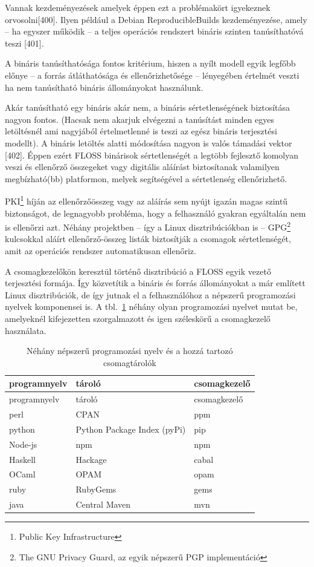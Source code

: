 \documentclass[12pt,magyar,a4paper,oneside]{scrreprt}
\begin{document}
Vannak kezdeményezések amelyek éppen ezt a problémakört igyekeznek
orvosolni{[}400{]}. Ilyen például a Debian ReproducibleBuilds
kezdeményezése, amely -- ha egyszer működik -- a teljes operációs
rendszert bináris szinten tanúsíthatóvá teszi {[}401{]}.

A bináris tanúsíthatósága fontos kritérium, hiszen a nyílt modell egyik
legfőbb előnye -- a forrás átláthatósága és ellenőrizhetősége --
lényegében értelmét veszti ha nem tanúsítható bináris állományokat
használunk.

Akár tanúsítható egy bináris akár nem, a bináris sértetlenségének
biztosítása nagyon fontos. (Hacsak nem akarjuk elvégezni a tanúsítást
minden egyes letöltésnél ami nagyjából értelmetlenné is teszi az egész
bináris terjesztési modellt). A bináris letöltés alatti módosítása
nagyon is valós támadási vektor {[}402{]}. Éppen ezért FLOSS binárisok
sértetlenségét a legtöbb fejlesztő komolyan veszi és ellenőrző
összegeket vagy digitális aláírást biztosítanak valamilyen
megbízható(bb) platformon, melyek segítségével a sértetlenség
ellenőrizhető.

PKI\footnote{Public Key Infrastructure} híján az ellenőrzőösszeg vagy az
aláírás sem nyújt igazán magas szintű biztonságot, de legnagyobb
probléma, hogy a felhasználó gyakran egyáltalán nem is ellenőrzi azt.
Néhány projektben -- így a Linux disztribúciókban is -- GPG\footnote{The
  GNU Privacy Guard, az egyik népszerű PGP implementáció} kulcsokkal
aláírt ellenőrző-összeg listák biztosítják a csomagok sértetlenségét,
amit az operációs rendszer automatikusan ellenőriz.

A csomagkezelőkön keresztül történő disztribúció a FLOSS egyik vezető
terjesztési formája. Így közvetítik a bináris és forrás állományokat a
már említett Linux disztribúciók, de így jutnak el a felhasználóhoz a
népszerű programozási nyelvek komponensei is. A tbl.~\ref{tbl:repos}
néhány olyan programozási nyelvet mutat be, amelyeknél kifejezetten
szorgalmazott és igen széleskörű a csomagkezelő használata.

\hypertarget{tbl:repos}{}
\begin{longtable}[]{@{}lll@{}}
\caption{\label{tbl:repos}Néhány népszerű programozási nyelv és a hozzá
tartozó csomagtárolók}\tabularnewline
\toprule
programnyelv & tároló & csomagkezelő\tabularnewline
\midrule
\endfirsthead
\toprule
programnyelv & tároló & csomagkezelő\tabularnewline
\midrule
\endhead
perl & CPAN & ppm\tabularnewline
python & Python Package Index (pyPi) & pip\tabularnewline
Node-js & npm & npm\tabularnewline
Haskell & Hackage & cabal\tabularnewline
OCaml & OPAM & opam\tabularnewline
ruby & RubyGems & gems\tabularnewline
java & Central Maven & mvn\tabularnewline
\bottomrule
\end{longtable}
\end{document}
